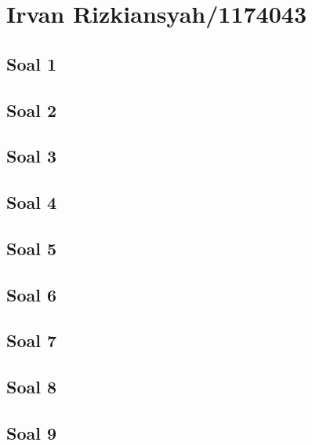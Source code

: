 \section{Irvan Rizkiansyah/1174043}
	\subsection{Soal 1}
		
	\subsection{Soal 2}
		
	\subsection{Soal 3}
		
	\subsection{Soal 4}
		
	\subsection{Soal 5}
		
	\subsection{Soal 6}
		
	\subsection{Soal 7}
		
	\subsection{Soal 8}
		
	\subsection{Soal 9}
		
